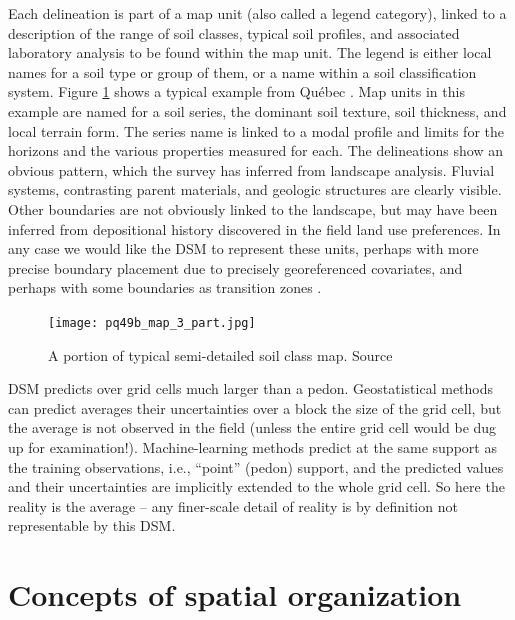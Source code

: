 \documentclass[soil, manuscript]{copernicus}
\begin{document}
\par
Each delineation is part of a map unit (also called a legend category), linked to a description of the range of soil classes, typical soil profiles, and associated laboratory analysis to be found within the map unit. The legend is either local names for a soil type or group of them, or a name within a soil classification system.
%
Figure \ref{fig:pq49b3} shows a typical example from Qu\'{e}bec \citep{grenonEtudePedologiqueComte1999}.
%
Map units in this example are named for a soil series, the dominant soil texture, soil thickness, and local terrain form.
%
The series name is linked to a modal profile and limits for the horizons and the various properties measured for each.
%
The delineations show an obvious pattern, which the survey has inferred from landscape analysis.
%
Fluvial systems, contrasting parent materials, and geologic structures are clearly visible.
%
Other boundaries are not obviously linked to the landscape, but may have been inferred from depositional history discovered in the field land use preferences.
%
In any case we would like the DSM to represent these units, perhaps with more precise boundary placement due to precisely georeferenced covariates, and perhaps with some boundaries as transition zones \citep{LagacherieFuzzinessuncertaintysoil1996}.

\begin{figure}
  \centering
  \texttt{[image: pq49b\_map\_3\_part.jpg]}  
  \caption{A portion of typical semi-detailed soil class map. Source \citep{grenonEtudePedologiqueComte1999}}
  \label{fig:pq49b3}
\end{figure}

\par
DSM predicts over grid cells much larger than a pedon.
%
Geostatistical methods can predict averages their uncertainties over a block the size of the grid cell, but the average is not observed in the field (unless the entire grid cell would be dug up for examination!).
%
Machine-learning methods predict at the same support as the training observations, i.e., ``point'' (pedon) support, and the predicted values and their uncertainties are implicitly extended to the whole grid cell.
%
So here the reality is the average -- any finer-scale detail of reality is by definition not representable by this DSM.

\section{Concepts of spatial organization}
\end{document}
